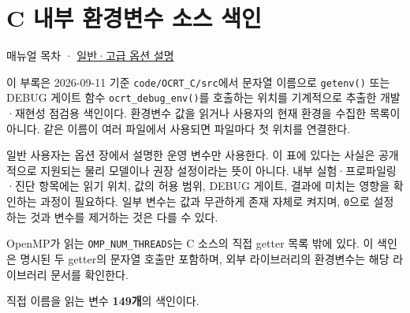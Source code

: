 \chapter{C 내부 환경변수 소스 색인}
\label{chap:03_environment_index}
매뉴얼 목차 · \hyperref[chap:03_options]{일반·고급 옵션 설명}

이 부록은 2026-09-11 기준 \texttt{code/\allowbreak{}OCRT\_\allowbreak{}C/\allowbreak{}src}에서 문자열 이름으로 \texttt{getenv()} 또는 DEBUG 게이트 함수 \texttt{ocrt\_\allowbreak{}debug\_\allowbreak{}env()}를 호출하는 위치를 기계적으로 추출한 개발·재현성 점검용 색인이다. 환경변수 값을 읽거나 사용자의 현재 환경을 수집한 목록이 아니다. 같은 이름이 여러 파일에서 사용되면 파일마다 첫 위치를 연결한다.

일반 사용자는 옵션 장에서 설명한 운영 변수만 사용한다. 이 표에 있다는 사실은 공개적으로 지원되는 물리 모델이나 권장 설정이라는 뜻이 아니다. 내부 실험·프로파일링·진단 항목에는 읽기 위치, 값의 허용 범위, DEBUG 게이트, 결과에 미치는 영향을 확인하는 과정이 필요하다. 일부 변수는 값과 무관하게 존재 자체로 켜지며, \texttt{0}으로 설정하는 것과 변수를 제거하는 것은 다를 수 있다.

OpenMP가 읽는 \texttt{OMP\_\allowbreak{}NUM\_\allowbreak{}THREADS}는 C 소스의 직접 getter 목록 밖에 있다. 이 색인은 명시된 두 getter의 문자열 호출만 포함하며, 외부 라이브러리의 환경변수는 해당 라이브러리 문서를 확인한다.

직접 이름을 읽는 변수 \textbf{149개}의 색인이다.


